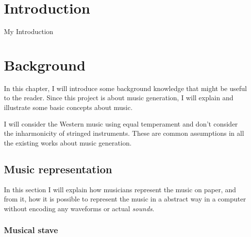 \documentclass[12pt]{report}
\begin{document}


\chapter{Introduction}
My Introduction

\chapter{Background}

In this chapter, I will introduce some background knowledge that might be useful to the reader. Since this project is about music generation, I will explain and illustrate some basic concepts about music.

I will consider the Western music using equal temperament and don't consider the inharmonicity of stringed instruments. These are common assumptions in all the existing works about music generation.


\section{Music representation}

In this section I will explain how musicians represent the music on paper, and from it, how it is possible to represent the music in a abstract way in a computer without encoding any waveforms or actual \textit{sounds}.

\subsection{Musical stave}
\end{document}
